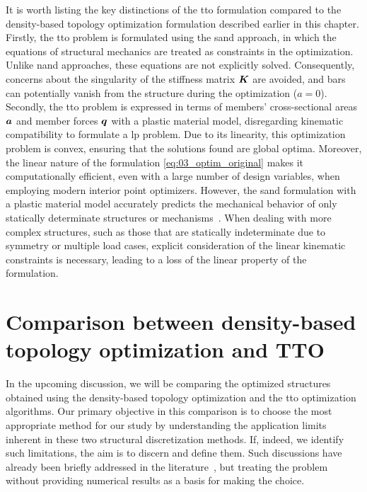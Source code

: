 It is worth listing the key distinctions of the \gls{tto} formulation compared to the density-based topology optimization formulation described earlier in this chapter. Firstly, the \gls{tto} problem is formulated using the \gls{sand} approach, in which the equations of structural mechanics are treated as constraints in the optimization. Unlike \gls{nand} approaches, these equations are not explicitly solved. Consequently, concerns about the singularity of the stiffness matrix $\bm{K}$ are avoided, and bars can potentially vanish from the structure during the optimization ($a=0$). Secondly, the \gls{tto} problem is expressed in terms of members' cross-sectional areas $\bm{a}$ and member forces $\bm{q}$ with a plastic material model, disregarding kinematic compatibility to formulate a \gls{lp} problem. Due to its linearity, this optimization problem is convex, ensuring that the solutions found are global optima. Moreover, the linear nature of the formulation \ref{eq:03_optim_original} makes it computationally efficient, even with a large number of design variables, when employing modern interior point optimizers. However, the \gls{sand} formulation with a plastic material model accurately predicts the mechanical behavior of only statically determinate structures or mechanisms~. When dealing with more complex structures, such as those that are statically indeterminate due to symmetry or multiple load cases, explicit consideration of the linear kinematic constraints is necessary, leading to a loss of the linear property of the formulation.

\section{Comparison between density-based topology optimization and TTO} \label{sec:03_comparison}
In the upcoming discussion, we will be comparing the optimized structures obtained using the density-based topology optimization and the \gls{tto} optimization algorithms. Our primary objective in this comparison is to choose the most appropriate method for our study by understanding the application limits inherent in these two structural discretization methods. If, indeed, we identify such limitations, the aim is to discern and define them. Such discussions have already been briefly addressed in the literature~, but treating the problem without providing numerical results as a basis for making the choice.

